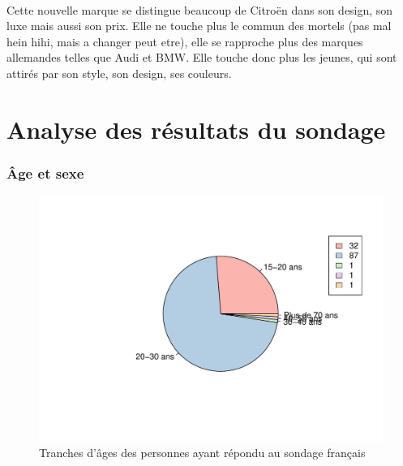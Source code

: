 \documentclass[12pt]{article}\usepackage[]{graphicx}\usepackage[]{color}
\makeatletter
\def\maxwidth{ %
  \ifdim\Gin@nat@width>\linewidth
    \linewidth
  \else
    \Gin@nat@width
  \fi
}
\newenvironment{kframe}{%
 \def\at@end@of@kframe{}%
 \ifinner\ifhmode%
  \def\at@end@of@kframe{\end{minipage}}%
  \begin{minipage}{\columnwidth}%
 \fi\fi%
 \def\FrameCommand##1{\hskip\@totalleftmargin \hskip-\fboxsep
 \colorbox{shadecolor}{##1}\hskip-\fboxsep
     \hskip-\linewidth \hskip-\@totalleftmargin \hskip\columnwidth}%
 \MakeFramed {\advance\hsize-\width
   \@totalleftmargin\z@ \linewidth\hsize
   \@setminipage}}%
 {\par\unskip\endMakeFramed%
 \at@end@of@kframe}
\newenvironment{knitrout}{}{} %
\makeatother
\begin{document}
\paragraph{} Cette nouvelle marque se distingue beaucoup de Citroën dans son
design, son luxe mais aussi son prix. Elle ne touche plus le commun des mortels
(pas mal hein hihi, mais a changer peut etre), elle se rapproche plus des
marques allemandes telles que Audi et BMW. Elle touche donc plus les jeunes,
qui sont attirés par son style, son design, ses couleurs.

\break
\part{Analyse des résultats du sondage}

\section{Âge et sexe}

\begin{knitrout}
\color{fgcolor}\begin{kframe}


{\ttfamily\noindent\itshape\color{messagecolor}{\#\# Loading required package: sysfonts\\\#\# Loading required package: NLP}}\end{kframe}
\end{knitrout}

\begin{knitrout}
\color{fgcolor}\begin{figure}[H]
\includegraphics[width=\maxwidth]{figure/tranche_age_fr-1} \caption[Tranches d'âges des personnes ayant répondu au sondage français]{Tranches d'âges des personnes ayant répondu au sondage français}\label{fig:tranche age fr}
\end{figure}


\end{knitrout}
\end{document}
